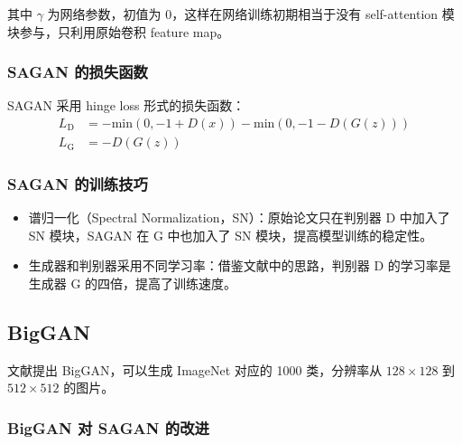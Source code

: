 其中 $\gamma$ 为网络参数，初值为 0，这样在网络训练初期相当于没有 self-attention
模块参与，只利用原始卷积 feature map。

\subsubsection{SAGAN 的损失函数}
SAGAN 采用 hinge loss 形式的损失函数：
\begin{align}
  L_{\mathrm{D}} & = -\mathrm{min} \left( 0, -1 + D(x) \right) - \mathrm{min} \left( 0, -1-D(G(z)) \right) \\
  L_{\mathrm{G}} & = -D(G(z))
\end{align}

\subsubsection{SAGAN 的训练技巧}
\begin{itemize}
  \item 谱归一化（Spectral Normalization，SN）：原始论文只在判别器 D 中加入了 SN
    模块，SAGAN 在 G 中也加入了 SN 模块，提高模型训练的稳定性。
  \item 生成器和判别器采用不同学习率：借鉴文献中的思路，判别器
    D 的学习率是生成器 G 的四倍，提高了训练速度。
\end{itemize}

\subsection{BigGAN}
文献提出 BigGAN，可以生成 ImageNet 对应的 1000 类，分辨率从
$128 \times 128$ 到 $512 \times 512$ 的图片。

\subsubsection{BigGAN 对 SAGAN 的改进}

